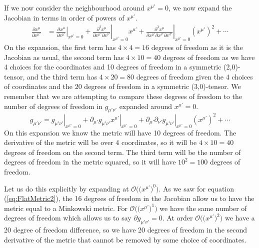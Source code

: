 \documentclass{article}
\begin{document}
 		If we now consider the neighbourhood around $x^{\mu'} = 0$, we now expand the Jacobian in terms in order of powers of $x^{\mu'}$.
 		\begin{align*}
 			\frac{\partial x^\mu}{\partial x^{\mu'}} &= \left. \frac{\partial x^\mu}{\partial x^{\mu'}} \right|_{x^{\mu'} = 0} + \left. \frac{\partial^2 x^\mu}{\partial x^{\mu'} \partial x^{\nu'} } \right|_{x^{\mu'} = 0} x^{\mu'} + \left. \frac{\partial^3 x^{\mu}}{\partial x^{\mu'} \partial x^{\nu'} \partial x^{\sigma'} }\right|_{x^{\mu'} = 0} \left( x^{\mu'} \right)^2 + \cdots 
 		\end{align*}
 		On the expansion, the first term has $4\times 4 = 16$ degrees of freedom as it is the Jacobian as usual, the second term has $4 \times 10 = 40$ degrees of freedom as we have 4 choices for the coordinates and 10 degrees of freedom in a symmetric (2,0)-tensor, and the third term has $4 \times 20 = 80$ degrees of freedom given the 4 choices of coordinates and the 20 degrees of freedom in a symmetric (3,0)-tensor. We remember that we are attempting to compare these degrees of freedom to the number of degrees of freedom in $g_{\mu'\nu'}$ expanded around $x^{\mu'} = 0$.
 		$$ g_{\mu'\nu'} = \left. g_{\mu'\nu'} \right|_{x^{\mu'} = 0} + \left. \partial_{\mu'} g_{\mu'\nu'} x^{\mu'} \right|_{x^{\mu'} = 0}+ \left. \partial_{\mu'} \partial_{\nu'} g_{\mu'\nu'} \right|_{x^{\mu'} = 0} \left( x^{\mu'}\right)^2 + \cdots$$
 		On this expansion we know the metric will have 10 degrees of freedom. The derivative of the metric will be over 4 coordinates, so it will be $4 \times 10 = 40$ degrees of freedom on the second term. The third term will be the number of degrees of freedom in the metric squared, so it will have $10^2 = 100$ degrees of freedom. 
 		
 		Let us do this explicitly by expanding at $\mathcal{O}\Big(\big(x^{\mu'} \big)^0\Big)$. As we saw for equation (\ref{eq:FlatMetric2}), the 16 degrees of freedom in the Jacobian allow us to have the metric equal to a Minkowski metric. For $\mathcal{O}\Big(\big(x^{\mu'} \big)^1\Big)$ we have the same number of degrees of freedom which allows us to say $\partial g_{\mu'\nu'} = 0$. At order $\mathcal{O}\Big(\big(x^{\mu'} \big)^2\Big)$ we have a 20 degree of freedom difference, so we have 20 degrees of freedom in the second derivative of the metric that cannot be removed by some choice of coordinates.
 		
\end{document}
